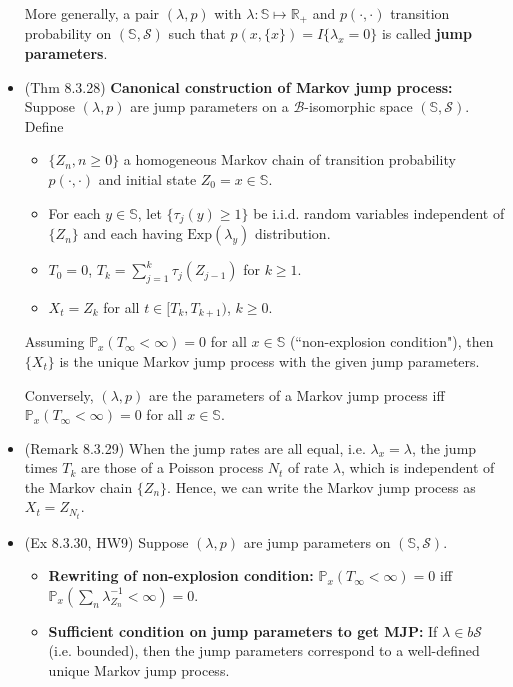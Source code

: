 \documentclass[twoside]{article}
\newcommand{\dis}{\displaystyle}
\newcommand\bbP{\mathbb{P}}
\newcommand\bbR{\mathbb{R}}
\newcommand\bbS{\mathbb{S}}
\newcommand\calB{\mathcal{B}}
\newcommand\calS{\mathcal{S}}
\newcommand\lmb{\lambda}
\begin{document}
\begin{itemize}
More generally, a pair $(\lmb, p)$ with $\lmb: \bbS \mapsto \bbR_+$ and $p(\cdot, \cdot)$ transition probability on $(\bbS, \calS)$ such that $p(x, \{ x\}) = I \{ \lmb_x = 0 \}$ is called \textbf{jump parameters}.

\item (Thm 8.3.28) \textbf{Canonical construction of Markov jump process:} Suppose $(\lmb, p)$ are jump parameters on a $\calB$-isomorphic space $(\bbS, \calS)$. Define
\begin{itemize}
\item $\{ Z_n, n \geq 0\}$ a homogeneous Markov chain of transition probability $p(\cdot, \cdot)$ and initial state $Z_0 = x \in \bbS$.

\item For each $y \in \bbS$, let $\{\tau_j(y) \geq 1 \}$ be i.i.d. random variables independent of $\{ Z_n\}$ and each having $\text{Exp}(\lmb_y)$ distribution.

\item $T_0 = 0$, $T_k = \dis\sum_{j=1}^k \tau_j (Z_{j-1})$ for $k \geq 1$.

\item $X_t = Z_k$ for all $t \in [T_k, T_{k+1})$, $k \geq 0$.
\end{itemize}
Assuming $\bbP_x(T_\infty < \infty) = 0$ for all $x \in \bbS$ (``non-explosion condition"), then $\{ X_t\}$ is the unique Markov jump process with the given jump parameters.

Conversely, $(\lmb, p)$ are the parameters of a Markov jump process iff $\bbP_x(T_\infty < \infty) = 0$ for all $x \in \bbS$.

\item (Remark 8.3.29) When the jump rates are all equal, i.e. $\lmb_x = \lmb$, the jump times $T_k$ are those of a Poisson process $N_t$ of rate $\lmb$, which is independent of the Markov chain $\{Z_n\}$. Hence, we can write the Markov jump process as $X_t = Z_{N_t}$.

\item (Ex 8.3.30, HW9)  Suppose $(\lmb, p)$ are jump parameters on $(\bbS, \calS)$. 
\begin{itemize}
\item \textbf{Rewriting of non-explosion condition:} $\bbP_x(T_\infty < \infty) = 0$ iff $\bbP_x \left(\sum_n \lmb_{Z_n}^{-1} < \infty \right) = 0$.

\item \textbf{Sufficient condition on jump parameters to get MJP:} If $\lmb \in b\calS$ (i.e. bounded), then the jump parameters correspond to a well-defined unique Markov jump process.
\end{itemize}


\end{itemize}
\end{document}

